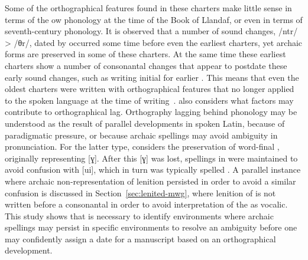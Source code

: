 Some of the orthographical features found in these charters make little sense in terms of the \gls{ow} phonology at the time of the Book of Llandaf, or even in terms of seventh-century phonology. It is observed that a number of sound changes, \eg /ntr/ > /θr/, dated by \textcite{jackson_language_1953} occurred some time before even the earliest charters, yet archaic forms are preserved in some of these charters. At the same time these earliest charters show a number of consonantal changes that appear to postdate these early sound changes, such as writing initial  for earlier . This means that even the oldest charters were written with orthographical features that no longer applied to the spoken language at the time of writing~\autocite[73]{Sim_emergenceOld91}.
\Textcite{Sim_emergenceOld91} also considers what factors may contribute to orthographical lag.
Orthography lagging behind phonology may be understood as the result of parallel developments in spoken Latin, because of paradigmatic pressure, or because archaic spellings may avoid ambiguity in pronunciation. For the latter type, \textcite[75]{Sim_emergenceOld91} considers the preservation of word-final , originally representing [ɣ]. After this [ɣ] was lost, spellings in  were maintained to avoid confusion with [ui], which in turn was typically spelled . A parallel instance where archaic non-representation of lenition persisted in order to avoid a similar confusion is discussed in Section~\ref{sec:lenited-mwg}, where lenition of  is not written before a consonantal  in order to avoid interpretation of the  as vocalic. This study shows that is necessary to identify environments where archaic spellings may persist in specific environments to resolve an ambiguity before one may confidently assign a date for a manuscript based on an orthographical development.

